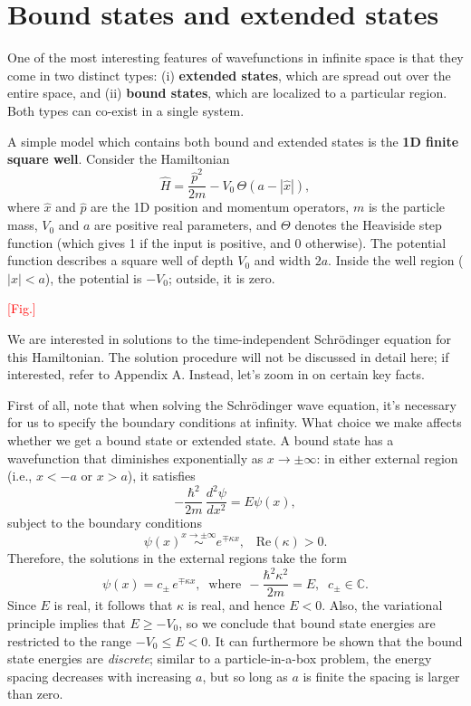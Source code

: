 \documentclass[pra,11pt]{revtex4}
\begin{document}
\section{Bound states and extended states}

One of the most interesting features of wavefunctions in infinite
space is that they come in two distinct types: (i) \textbf{extended
  states}, which are spread out over the entire space, and (ii)
\textbf{bound states}, which are localized to a particular region.
Both types can co-exist in a single system.

A simple model which contains both bound and extended states is the
\textbf{1D finite square well}.  Consider the Hamiltonian
$$\hat{H} = \frac{\hat{p}^2}{2m} - V_0 \,\Theta(a -|\hat{x}|),$$
where $\hat{x}$ and $\hat{p}$ are the 1D position and momentum
operators, $m$ is the particle mass, $V_0$ and $a$ are positive real
parameters, and $\Theta$ denotes the Heaviside step function (which
gives 1 if the input is positive, and 0 otherwise).  The potential
function describes a square well of depth $V_0$ and width $2a$.
Inside the well region ($|x| < a$), the potential is $-V_0$; outside,
it is zero.

\textcolor{red}{[Fig.]}

We are interested in solutions to the time-independent Schr\"odinger
equation for this Hamiltonian.  The solution procedure will not be
discussed in detail here; if interested, refer to Appendix A.
Instead, let's zoom in on certain key facts.

First of all, note that when solving the Schr\"odinger wave equation,
it's necessary for us to specify the boundary conditions at infinity.
What choice we make affects whether we get a bound state or extended
state.  A bound state has a wavefunction that diminishes exponentially
as $x \rightarrow \pm\infty$: in either external region (i.e., $x <
-a$ or $x > a$), it satisfies
$$-\frac{\hbar^2}{2m}\,\frac{d^2\psi}{dx^2} = E \psi(x),$$
subject to the boundary conditions
$$\psi(x) \overset{x\rightarrow\pm\infty}{\sim} e^{\mp\kappa x}, \;\;\;\mathrm{Re}(\kappa) > 0.$$
Therefore, the solutions in the external regions take the form
$$\psi(x) = c_\pm\, e^{\mp\kappa x}, \;\;\mathrm{where}\;\, -\frac{\hbar^2\kappa^2}{2m} = E, \;\; c_\pm \in \mathbb{C}.$$
Since $E$ is real, it follows that $\kappa$ is real, and hence $E <
0$.  Also, the variational principle implies that $E \ge -V_0$, so we
conclude that bound state energies are restricted to the range $-V_0
\le E < 0$.  It can furthermore be shown that the bound state energies
are \textit{discrete}; similar to a particle-in-a-box problem, the
energy spacing decreases with increasing $a$, but so long as $a$ is
finite the spacing is larger than zero.
\end{document}
